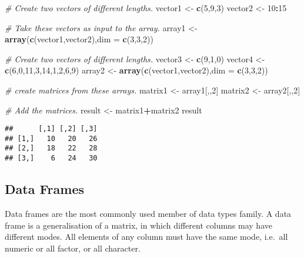 \documentclass[]{book}
\newenvironment{Shaded}{\begin{snugshade}}{\end{snugshade}}
\newcommand{\KeywordTok}[1]{\textcolor[rgb]{0.13,0.29,0.53}{\textbf{#1}}}
\newcommand{\DataTypeTok}[1]{\textcolor[rgb]{0.13,0.29,0.53}{#1}}
\newcommand{\DecValTok}[1]{\textcolor[rgb]{0.00,0.00,0.81}{#1}}
\newcommand{\StringTok}[1]{\textcolor[rgb]{0.31,0.60,0.02}{#1}}
\newcommand{\CommentTok}[1]{\textcolor[rgb]{0.56,0.35,0.01}{\textit{#1}}}
\newcommand{\OperatorTok}[1]{\textcolor[rgb]{0.81,0.36,0.00}{\textbf{#1}}}
\newcommand{\NormalTok}[1]{#1}
\theoremstyle{definition}
\theoremstyle{definition}
\theoremstyle{definition}
\theoremstyle{remark}
\begin{document}
\begin{Shaded}
\begin{Highlighting}[]
\CommentTok{# Create two vectors of different lengths.}
\NormalTok{vector1 <-}\StringTok{ }\KeywordTok{c}\NormalTok{(}\DecValTok{5}\NormalTok{,}\DecValTok{9}\NormalTok{,}\DecValTok{3}\NormalTok{)}
\NormalTok{vector2 <-}\StringTok{ }\DecValTok{10}\OperatorTok{:}\DecValTok{15}

\CommentTok{# Take these vectors as input to the array.}
\NormalTok{array1 <-}\StringTok{ }\KeywordTok{array}\NormalTok{(}\KeywordTok{c}\NormalTok{(vector1,vector2),}\DataTypeTok{dim =} \KeywordTok{c}\NormalTok{(}\DecValTok{3}\NormalTok{,}\DecValTok{3}\NormalTok{,}\DecValTok{2}\NormalTok{))}

\CommentTok{# Create two vectors of different lengths.}
\NormalTok{vector3 <-}\StringTok{ }\KeywordTok{c}\NormalTok{(}\DecValTok{9}\NormalTok{,}\DecValTok{1}\NormalTok{,}\DecValTok{0}\NormalTok{)}
\NormalTok{vector4 <-}\StringTok{ }\KeywordTok{c}\NormalTok{(}\DecValTok{6}\NormalTok{,}\DecValTok{0}\NormalTok{,}\DecValTok{11}\NormalTok{,}\DecValTok{3}\NormalTok{,}\DecValTok{14}\NormalTok{,}\DecValTok{1}\NormalTok{,}\DecValTok{2}\NormalTok{,}\DecValTok{6}\NormalTok{,}\DecValTok{9}\NormalTok{)}
\NormalTok{array2 <-}\StringTok{ }\KeywordTok{array}\NormalTok{(}\KeywordTok{c}\NormalTok{(vector1,vector2),}\DataTypeTok{dim =} \KeywordTok{c}\NormalTok{(}\DecValTok{3}\NormalTok{,}\DecValTok{3}\NormalTok{,}\DecValTok{2}\NormalTok{))}

\CommentTok{# create matrices from these arrays.}
\NormalTok{matrix1 <-}\StringTok{ }\NormalTok{array1[,,}\DecValTok{2}\NormalTok{]}
\NormalTok{matrix2 <-}\StringTok{ }\NormalTok{array2[,,}\DecValTok{2}\NormalTok{]}

\CommentTok{# Add the matrices.}
\NormalTok{result <-}\StringTok{ }\NormalTok{matrix1}\OperatorTok{+}\NormalTok{matrix2}
\NormalTok{result}
\end{Highlighting}
\end{Shaded}

\begin{verbatim}
##      [,1] [,2] [,3]
## [1,]   10   20   26
## [2,]   18   22   28
## [3,]    6   24   30
\end{verbatim}

\subsection{Data Frames}\label{data-frames}

Data frames are the most commonly used member of data types family. A
data frame is a generalisation of a matrix, in which different columns
may have different modes. All elements of any column must have the same
mode, i.e.~all numeric or all factor, or all character.
\end{document}
